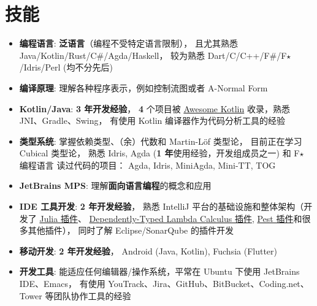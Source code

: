 \documentclass{resume}
\begin{document}
\section{技能}
\begin{itemize}[parsep=0.25ex]
  \item \textbf{编程语言}:
    \textbf{泛语言}（编程不受特定语言限制），
    且尤其熟悉 Java/Kotlin/Rust/C\#/Agda/Haskell，
    较为熟悉 Dart/C/C++/F\#/F$\star$/Idris/Perl (均不分先后)

  \item \textbf{编译原理}:
    理解各种程序表示，例如控制流图或者 A-Normal Form

  \item \textbf{Kotlin/Java}:
    \textbf{3 年开发经验}，
    \textbf{4} 个项目被
    \href{https://kotlin.link/?q=ice} {Awesome Kotlin}
    收录，熟悉 JNI、Gradle、Swing，
    有使用 Kotlin 编译器作为代码分析工具的经验

  \item \textbf{类型系统}:
    掌握依赖类型、（余）代数和 Martin-L\"{o}f 类型论，
    目前正在学习 Cubical 类型论，
    熟悉 Idris, Agda (\textbf{1 年}使用经验，开发组成员之一)
    和 F$\star$ 编程语言
    \subitem 读过代码的项目： Agda, Idris, MiniAgda, Mini-TT, TOG

  \item \textbf{JetBrains MPS}:
    理解\textbf{面向语言编程}的概念和应用

  \item \textbf{IDE 工具开发}:
    \textbf{2 年开发经验}，
    熟悉 IntelliJ 平台的基础设施和整体架构（开发了
      \href{https://plugins.jetbrains.com/plugin/10413}
           {Julia 插件}、
      \href{https://plugins.jetbrains.com/plugin/12176}
           {Dependently-Typed Lambda Calculus 插件},
      \href{https://plugins.jetbrains.com/plugin/12046}
           {Pest 插件}和很多其他插件），
    同时了解 Eclipse/SonarQube 的插件开发

  \item \textbf{移动开发}:
    \textbf{2 年开发经验}，
    Android (Java, Kotlin), Fuchsia (Flutter)

  \item \textbf{开发工具}:
    能适应任何编辑器/操作系统，平常在 Ubuntu 下使用 JetBrains IDE、Emacs，
    有使用 YouTrack、Jira、GitHub、BitBucket、Coding.net、Tower 等团队协作工具的经验
\end{itemize}

\end{document}
